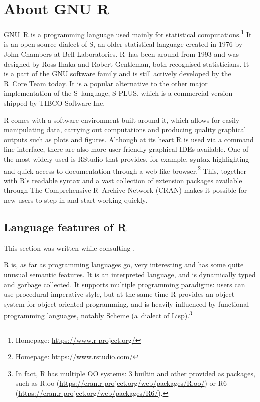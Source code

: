 \chapter{About GNU R\label{gnur}}

GNU~R \autocite{about} is a programming language used mainly for statistical computations.\footnote{Homepage: \url{https://www.r-project.org/}} It is an open-source dialect of S, an older statistical language created in 1976 by John Chambers at Bell Laboratories. R~has been around from 1993 and was designed by Ross Ihaka and Robert Gentleman, both recognised statisticians. It is a part of the GNU software family and is still actively developed by the R~Core Team today. It is a popular alternative to the other major implementation of the S~language, S-PLUS, which is a commercial version shipped by TIBCO Software Inc.

R comes with a software environment built around it, which allows for easily manipulating data, carrying out computations and producing quality graphical outputs such as plots and figures. Although at its heart R is used via a command line interface, there are also more user-friendly graphical IDEs available. One of the most widely used is RStudio that provides, for example, syntax highlighting and quick access to documentation through a web-like browser.\footnote{Homepage: \url{https://www.rstudio.com/}} This, together with R's readable syntax and a vast collection of extension packages available through The Comprehensive R~Archive Network (CRAN) makes it possible for new users to step in and start working quickly.


\section{Language features of R}

This section was written while consulting \autocite{hadley, design, inferno, rint, rlang}.

R is, as far as programming languages go, very interesting and has some quite unusual semantic features. It is an interpreted language, and is dynamically typed and garbage collected. It supports multiple programming paradigms: users can use procedural imperative style, but at the same time R provides an object system for object oriented programming, and is heavily influenced by functional programming languages, notably Scheme (a~dialect of Lisp).\footnote{In fact, R has multiple OO systems: 3 builtin and other provided as packages, such as R.oo (\url{https://cran.r-project.org/web/packages/R.oo/}) or R6 (\url{https://cran.r-project.org/web/packages/R6/}).}

